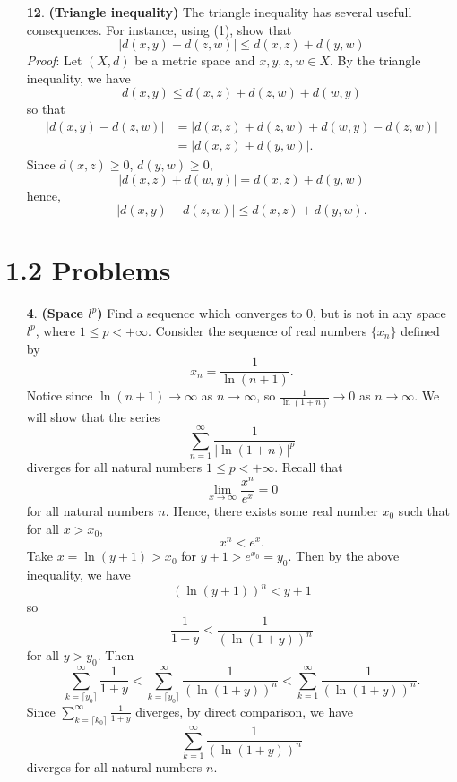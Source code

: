 \documentclass{article}
\begin{document}
\begin{itemize}
    
    \item[\textbf{12}.] \textbf{(Triangle inequality)} The triangle inequality has several usefull consequences. For instance, using (1), show that 
    \[|d(x,y) - d(z,w)| \leq d(x,z) + d(y,w)\]
    \newline\newline
    \textit{Proof}: Let $(X,d)$ be a metric space and $x,y,z,w \in X$. By the triangle inequality, we have 
    \[d(x,y) \leq d(x,z) + d(z,w) + d(w,y)\]
    so that
    \begin{align*}
        |d(x,y) - d(z,w)| &= |d(x,z) + d(z,w) + d(w,y) - d(z,w)|\\
        &= |d(x,z) + d(y,w)|.
    \end{align*}
    Since $d(x,z) \geq 0$, $d(y,w) \geq 0$,
    \[|d(x,z) + d(w,y)| = d(x,z) + d(y,w)\]
    hence,
    \[|d(x,y) - d(z,w)| \leq d(x,z) + d(y,w).\]
\end{itemize}


\section*{1.2 Problems}
\begin{itemize}
    \item[\textbf{4}.] \textbf{(Space $l^p$)} Find a sequence which converges to 0, but is not in any space $l^p$, where $1 \leq p < + \infty$.
    \newline\newline
    Consider the sequence of real numbers $\{x_n\}$ defined by
    \[x_n = \frac{1}{\ln(n + 1)}.\]
    Notice since $\ln(n + 1) \to \infty$ as $n \to \infty$, so $\frac{1}{\ln(1 + n)} \to 0$ as $n \to \infty$. We will show that the series
    \[\sum_{n = 1}^{\infty} \frac{1}{|\ln(1 + n)|^p}\]
    diverges for all natural numbers $1 \leq p < +\infty$. Recall that
    \[\lim_{x \to \infty} \frac{x^n}{e^x} = 0\]
    for all natural numbers $n$. Hence, there exists some real number $x_0$ such that for all $x > x_0$,
    \[x^n < e^x.\]
    Take $x = \ln(y + 1) > x_0$ for $y + 1 > e^{x_0} = y_0$. Then by the above inequality, we have
    \[(\ln(y+1))^n < y + 1\]
    so
    \[\frac{1}{1 + y} < \frac{1}{(\ln(1 + y))^n}\]
    for all $y > y_0$. Then
    \[\sum_{k = \lceil y_0\rceil}^{\infty} \frac{1}{1 + y} < \sum_{k = \lceil y_0\rceil}^{\infty} \frac{1}{(\ln(1 + y))^n} < \sum_{k = 1}^{\infty} \frac{1}{(\ln(1 + y))^n}.\]
    Since $\sum_{k = \lceil k_0\rceil}^{\infty} \tfrac{1}{1 + y}$ diverges, by direct comparison, we have 
    \[\sum_{k = 1}^{\infty} \frac{1}{(\ln(1 + y))^n}\]
    diverges for all natural numbers $n$.

    


    
\end{itemize}
\end{document}
